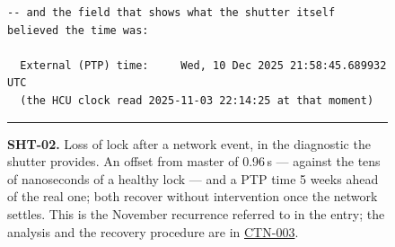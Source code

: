 \begin{description}
\begin{figure}[H]
\begin{minipage}{\textwidth}
\begin{verbatim}
-- and the field that shows what the shutter itself believed the time was:

  External (PTP) time:     Wed, 10 Dec 2025 21:58:45.689932 UTC
  (the HCU clock read 2025-11-03 22:14:25 at that moment)
\end{verbatim}
\endgroup
\vspace{-10pt}\hrule
\end{minipage}
\caption{\textbf{SHT-02.} Loss of lock after a network event, in the diagnostic the shutter provides.  An offset from master of 0.96\,s --- against the tens of nanoseconds of a healthy lock --- and a PTP time 5 weeks ahead of the real one; both recover without intervention once the network settles.  This is the November recurrence referred to in the entry; the analysis and the recovery procedure are in \href{https://ctn-003.lsst.io}{CTN-003}.}
\label{fig:iss-SHT-02}
\end{figure}

\end{description}

